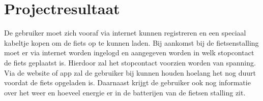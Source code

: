 \section{Projectresultaat}

De gebruiker moet zich vooraf via internet kunnen registreren en een speciaal kabeltje kopen om de fiets op te kunnen laden. Bij aankomst bij de fietsenstalling moet er via internet worden ingelogd en aangegeven worden in welk stopcontact de fiets geplaatst is. Hierdoor zal het stopcontact voorzien worden van spanning. Via de website of app zal de gebruiker bij kunnen houden hoelang het nog duurt voordat de fiets opgeladen is. Daarnaast krijgt de gebruiker ook nog informatie over het weer en hoeveel energie er in de batterijen van de fietsen stalling zit. 


  